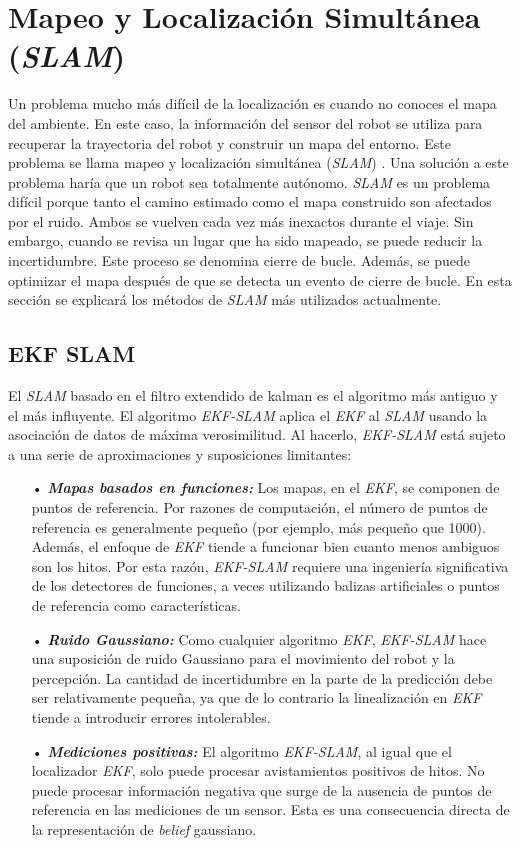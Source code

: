 \section{Mapeo y Localizaci\'on Simult\'anea (\textit{SLAM})}
Un problema mucho m\'as dif\'icil de la localizaci\'on es cuando no conoces el mapa del ambiente. En 
este caso, la informaci\'on del sensor del robot se utiliza para recuperar la trayectoria del robot 
y construir un mapa del entorno. Este problema se llama mapeo y localizaci\'on simult\'anea 
(\textit{SLAM}) \cite{Thrun2005}. Una soluci\'on a este problema har\'ia que un robot sea totalmente 
aut\'onomo. \textit{SLAM} es un problema dif\'icil porque tanto el camino estimado como el mapa 
construido son afectados por el ruido. Ambos se vuelven cada vez m\'as inexactos durante el viaje. Sin 
embargo, cuando se revisa un lugar que ha sido mapeado, se puede reducir la incertidumbre. Este proceso 
se denomina cierre de bucle. Adem\'as, se puede optimizar el mapa despu\'es de que se detecta un evento 
de cierre de bucle. En esta secci\'on se explicar\'a los m\'etodos de \textit{SLAM} m\'as utilizados 
actualmente.

\subsection{EKF SLAM}
El \textit{SLAM} basado en el filtro extendido de kalman es el algoritmo m\'as antiguo y el m\'as influyente. El
algoritmo \textit{EKF-SLAM} aplica el \textit{EKF} al \textit{SLAM} usando la asociaci\'on de datos de m\'axima 
verosimilitud. Al hacerlo, \textit{EKF-SLAM} est\'a sujeto a una serie de aproximaciones y suposiciones
limitantes:
\begin{itemize}
	\item[•] \textit{\textbf{Mapas basados en funciones:}} Los mapas, en el \textit{EKF}, se componen de puntos
	de referencia. Por razones de computaci\'on, el n\'umero de puntos de referencia es generalmente
	peque\~no (por ejemplo, m\'as peque\~no que 1000). Adem\'as, el enfoque de \textit{EKF} tiende a
	funcionar bien cuanto menos ambiguos son los hitos. Por esta raz\'on, \textit{EKF-SLAM} requiere una
	ingenier\'ia significativa de los detectores de funciones, a veces utilizando balizas
	artificiales o puntos de referencia como caracter\'isticas.
	\item[•] \textit{\textbf{Ruido Gaussiano:}} Como cualquier algoritmo \textit{EKF}, \textit{EKF-SLAM} 
	hace una suposici\'on de ruido Gaussiano para el movimiento del robot y la percepci\'on. La
	cantidad de incertidumbre en la parte de la predicci\'on debe ser relativamente
	peque\~na, ya que de lo contrario la linealizaci\'on en \textit{EKF} tiende a introducir 
	errores intolerables.
	\item[•] \textit{\textbf{Mediciones positivas:}} El algoritmo \textit{EKF-SLAM}, al igual 
	que el localizador \textit{EKF}, solo puede procesar avistamientos positivos de hitos. No
	puede procesar informaci\'on negativa que surge de la ausencia de puntos de referencia en 
	las mediciones de un sensor. Esta es una consecuencia directa de la representaci\'on
	de \textit{belief} gaussiano.
\end{itemize}

